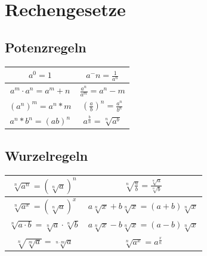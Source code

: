 \section{Rechengesetze}
\begin{multicols}{2}
\subsection{Potenzregeln}
\renewcommand{\arraystretch}{2}
\begin{tabular}{|c|c|}
	\hline $a^0=1$ & $a^-n= \frac{1}{a^n}$\\
	\hline $a^m \cdot a^n = a^m+n$ & $\frac{a^n}{a^m}= a^n-m$\\
	\hline $(a^n)^m = a^n*m$ & $(\frac{a}{b})^n = \frac{a^n}{b^n}$\\
	 \hline $a^n*b^n = (ab)^n$ & $a^\frac{b}{n}= \sqrt[n]{a^b}$\\
	 \hline
\end{tabular}

\subsection{Wurzelregeln}
\renewcommand{\arraystretch}{2}
\begin{tabular}{|c|c|}
	\hline $\sqrt[n]{a^n}= (\sqrt[n]{a})^n$ & $\sqrt[n]{\frac{a}{b}} = \frac{\sqrt[n]{a}}{\sqrt[n]{b}}$\\
	\hline $\sqrt[n]{a^x}=(\sqrt[n]{a})^x$ & $a\sqrt[n]{x} + b \sqrt[n]{x} = (a+b)\sqrt[n]{x}$\\
	\hline $\sqrt[n]{a \cdot b} = \sqrt[n]{a} \cdot \sqrt[n]{b}$ & $a\sqrt[n]{x} - b \sqrt[n]{x} = (a-b)\sqrt[n]{x}$\\
	\hline $\sqrt[n]{\sqrt[m]{a}}= \sqrt[n \cdot m]{a}$ & $\sqrt[n]{a^x}= a^\frac{x}{n}$ \\
	\hline
\end{tabular}
\end{multicols}

